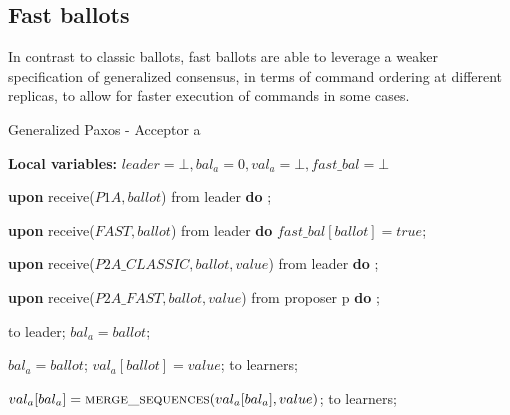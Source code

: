 \subsection{Fast ballots} 

In contrast to classic ballots, fast ballots are able to leverage a weaker specification of generalized consensus, in terms of command ordering at different replicas, to allow for faster execution of commands in some cases.

\begin{algorithm} 
	\caption{Generalized Paxos - Acceptor a}
	\textbf{Local variables:} $leader = \bot, bal_a = 0,val_a = \bot,fast\_bal = \bot$
	\begin{algorithmic}[1]
		\State \textbf{upon} receive($P1A, ballot$) from leader \textbf{do}
		\State \hspace{\algorithmicindent} ;
		
		\State
		\State \textbf{upon} receive($FAST,ballot$) from leader \textbf{do}
		\State \hspace{\algorithmicindent} $fast\_bal[ballot] = true$;
		
		\State
		\State \textbf{upon} receive($P2A\_CLASSIC, ballot, value$) from leader \textbf{do}
		\State \hspace{\algorithmicindent} ; 
		
		\State		
		\State \textbf{upon} receive($P2A\_FAST,ballot,value$) from proposer p \textbf{do}
		\State \hspace{\algorithmicindent} ;
		
		\State
		\State {} to leader;
		\State $bal_a = ballot$;	
		\EndIf
		\EndFunction
		
		\State
		\State $bal_a = ballot$;
		\State $val_a[ballot] = value$;
		\State {} to learners;
		
		\EndIf
		\EndFunction
		
		\State
		\State $val_a[bal_a] =  \Call{merge\_sequences}{val_a[bal_a], value}$;
		\State {} to learners;
		\EndIf
		\EndFunction
	\end{algorithmic}
\end{algorithm}
